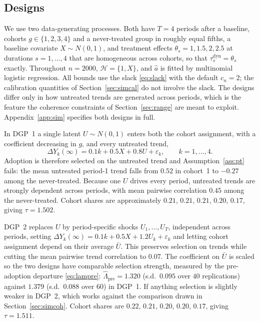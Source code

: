 \documentclass[12pt]{article}
\theoremstyle{remark}
\begin{document}
\subsection{Designs}
\label{sec:simdesign}

We use two data-generating processes. Both have $T = 4$ periods after a baseline, cohorts
$g \in \{1,2,3,4\}$ and a never-treated group in roughly equal fifths, a baseline
covariate $X \sim N(0,1)$, and treatment effects $\theta_s = 1, 1.5, 2, 2.5$ at durations
$s = 1, \ldots, 4$ that are homogeneous across cohorts, so that
$\tau^{\mathrm{dyn}}_s = \theta_s$ exactly. Throughout $n = 2000$,
$\mathcal{H} = \{1, X\}$, and $\widehat a$ is fitted by multinomial logistic regression.
All bounds use the slack \eqref{eq:slack} with the default $c_n = 2$; the calibration
quantities of Section~\ref{sec:simcal} do not involve the slack. The designs differ only in how untreated trends are generated across
periods, which is the feature the coherence constraints of Section~\ref{sec:range} are
meant to exploit. Appendix~\ref{app:sim} specifies both designs in full.

In DGP~1 a single latent $U \sim N(0,1)$ enters both the cohort assignment, with a
coefficient decreasing in $g$, and every untreated trend,
\[
\Delta Y_k(\infty) = 0.1k + 0.5X + 0.8U + \varepsilon_k, \qquad k = 1, \ldots, 4 .
\]
Adoption is therefore selected on the untreated trend and Assumption~\ref{ass:pt} fails:
the mean untreated period-1 trend falls from $0.52$ in cohort~1 to $-0.27$ among the
never-treated. Because one $U$ drives every period, untreated trends are strongly
dependent across periods, with mean pairwise correlation $0.45$ among the never-treated.
Cohort shares are approximately $0.21$, $0.21$, $0.21$, $0.20$, $0.17$, giving
$\tau = 1.502$.

DGP~2 replaces $U$ by period-specific shocks $U_1, \ldots, U_T$, independent across
periods, setting $\Delta Y_k(\infty) = 0.1k + 0.5X + 1.2U_k + \varepsilon_k$ and letting
cohort assignment depend on their average $\bar U$. This preserves selection on trends
while cutting the mean pairwise trend correlation to $0.07$. The coefficient on $\bar U$
is scaled so the two designs have comparable selection strength, measured by the
pre-adoption departure \eqref{eq:lampre}: $\widehat\Lambda_{\mathrm{pre}} =
1.320$ (s.d.\ $0.095$ over $40$ replications) against $1.379$ (s.d.\ $0.088$ over $60$)
in DGP~1. If anything selection is slightly weaker in DGP~2, which works against the
comparison drawn in Section~\ref{sec:simcoh}. Cohort shares are $0.22$, $0.21$, $0.20$,
$0.20$, $0.17$, giving $\tau = 1.511$.
\end{document}

